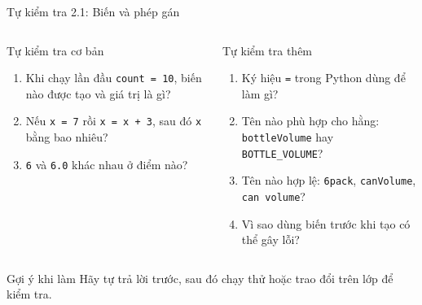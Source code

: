 \documentclass[aspectratio=169,10pt]{beamer}
\begin{document}
\begin{frame}{Tự kiểm tra 2.1: Biến và phép gán}
\small
\begin{columns}[T,onlytextwidth]
\begin{block}{Tự kiểm tra cơ bản}
\begin{enumerate}
  \item Khi chạy lần đầu \texttt{count = 10}, biến nào được tạo và giá trị là gì?
  \item Nếu \texttt{x = 7} rồi \texttt{x = x + 3}, sau đó \texttt{x} bằng bao nhiêu?
  \item \texttt{6} và \texttt{6.0} khác nhau ở điểm nào?
\end{enumerate}
\end{block}
\begin{block}{Tự kiểm tra thêm}
\begin{enumerate}
  \item Ký hiệu \texttt{=} trong Python dùng để làm gì?
  \item Tên nào phù hợp cho hằng: \texttt{bottleVolume} hay \texttt{BOTTLE\_VOLUME}?
  \item Tên nào hợp lệ: \texttt{6pack}, \texttt{canVolume}, \texttt{can volume}?
  \item Vì sao dùng biến trước khi tạo có thể gây lỗi?
\end{enumerate}
\end{block}
\end{columns}
\begin{alertblock}{Gợi ý khi làm}
Hãy tự trả lời trước, sau đó chạy thử hoặc trao đổi trên lớp để kiểm tra.
\end{alertblock}
\end{frame}
\end{document}
